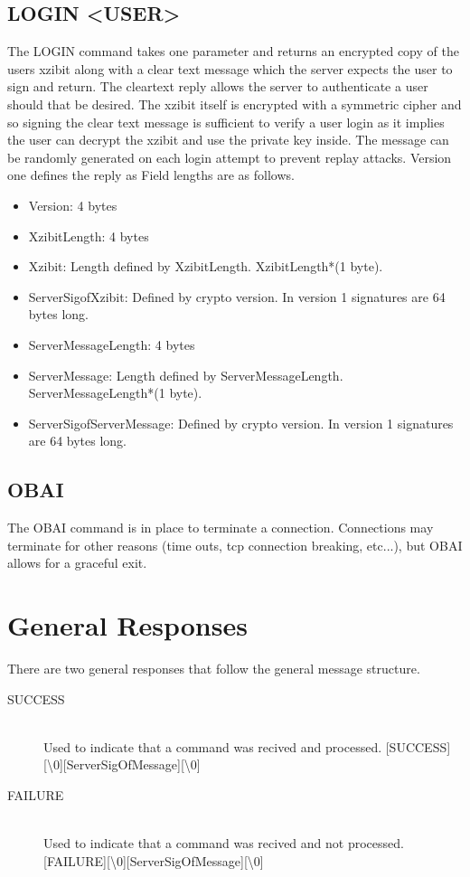 \documentclass[a4paper,11pt]{article}
\begin{document}
\subsection{LOGIN <USER>}
The LOGIN command takes one parameter and returns an encrypted copy of the users xzibit along with a clear text message which the server expects the user to sign and return. The cleartext reply allows the server to authenticate a user should that be desired. The xzibit itself is encrypted with a symmetric cipher and so signing the clear text message is sufficient to verify a user login as it implies the user can decrypt the xzibit and use the private key inside. The message can be randomly generated on each login attempt to prevent replay attacks. Version one defines the reply as 
\newline
[Version][XzibitLength][Xzibit][ServerSigofXzibit][ServerMessageLength][ServerMessage][ServerSigofServerMessage]
\newline
Field lengths are as follows.
\begin{itemize}
  \item Version: 4 bytes
  \item XzibitLength: 4 bytes
  \item Xzibit: Length defined by XzibitLength. XzibitLength*(1 byte).
  \item ServerSigofXzibit: Defined by crypto version. In version 1 signatures are 64 bytes long.
  \item ServerMessageLength: 4 bytes
  \item ServerMessage: Length defined by ServerMessageLength. ServerMessageLength*(1 byte).
  \item ServerSigofServerMessage: Defined by crypto version. In version 1 signatures are 64 bytes long.
\end{itemize}
\subsection{OBAI}
The OBAI command is in place to terminate a connection. Connections may terminate for other reasons (time outs, tcp connection breaking, etc...), but OBAI allows for a graceful exit. 

\section{General Responses}
There are two general responses that follow the general message structure.
\begin{description}
  \item [SUCCESS] \hfill \\
  Used to indicate that a command was recived and processed.
  [SUCCESS][\textbackslash 0][ServerSigOfMessage][\textbackslash 0]
  \item [FAILURE] \hfill \\
  Used to indicate that a command was recived and not processed.
  [FAILURE][\textbackslash 0][ServerSigOfMessage][\textbackslash 0]
\end{description}
\end{document}
